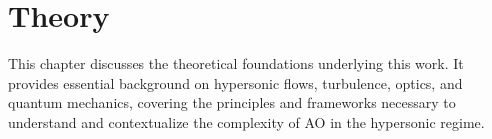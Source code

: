 \chapter{Theory\label{ch:ch2}}
This chapter discusses the theoretical foundations underlying this work. It
provides essential background on hypersonic flows, turbulence, optics, and
quantum mechanics, covering the principles and frameworks necessary to
understand and contextualize the complexity of \gls{AO} in the hypersonic regime.
